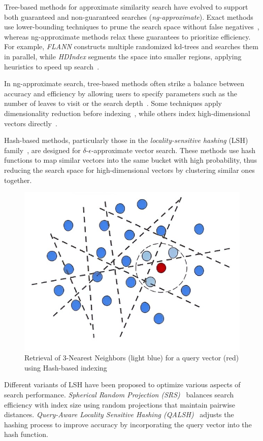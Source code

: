 Tree-based methods for approximate similarity search have evolved to support both guaranteed and non-guaranteed searches (\textit{ng-approximate}). Exact methods use lower-bounding techniques to prune the search space without false negatives~\cite{conf/sigmod/Faloutsos1994}, whereas ng-approximate methods relax these guarantees to prioritize efficiency. For example, \textit{FLANN} constructs multiple randomized kd-trees and searches them in parallel, while \textit{HDIndex} segments the space into smaller regions, applying heuristics to speed up search~\cite{flann,hdindex}.

In ng-approximate search, tree-based methods often strike a balance between accuracy and efficiency by allowing users to specify parameters such as the number of leaves to visit or the search depth~\cite{hydra2,dumpy}. Some techniques apply dimensionality reduction before indexing~\cite{journal/kais/Camerra2014,journal/vldb/Zoumpatianos2016,dstree,ulisse,hercules}, while others index high-dimensional vectors directly~\cite{conf/vldb/Ciaccia1997}.

 Hash-based methods, particularly those in the \textit{locality-sensitive hashing} (LSH) family~\cite{conf/stoc/indyk1998,lsh-survey}, are designed for \(\delta\)-\(\epsilon\)-approximate vector search. These methods use hash functions to map similar vectors into the same bucket with high probability, thus reducing the search space for high-dimensional vectors by clustering similar ones together.

\begin{figure}[ht] 
\centering
		\captionsetup{justification=centering}
		\includegraphics[width=0.5\columnwidth]{../img/related/hashb.jpg}
		\caption{Retrieval of 3-Nearest Neighbors (light blue) for a query vector (red) using Hash-based indexing}        
		\label{fig:hash_retrieval}
\end{figure}

Different variants of LSH have been proposed to optimize various aspects of search performance. \textit{Spherical Random Projection (SRS)}~\cite{srs} balances search efficiency with index size using random projections that maintain pairwise distances. \textit{Query-Aware Locality Sensitive Hashing (QALSH)}~\cite{qalsh} adjusts the hashing process to improve accuracy by incorporating the query vector into the hash function.

